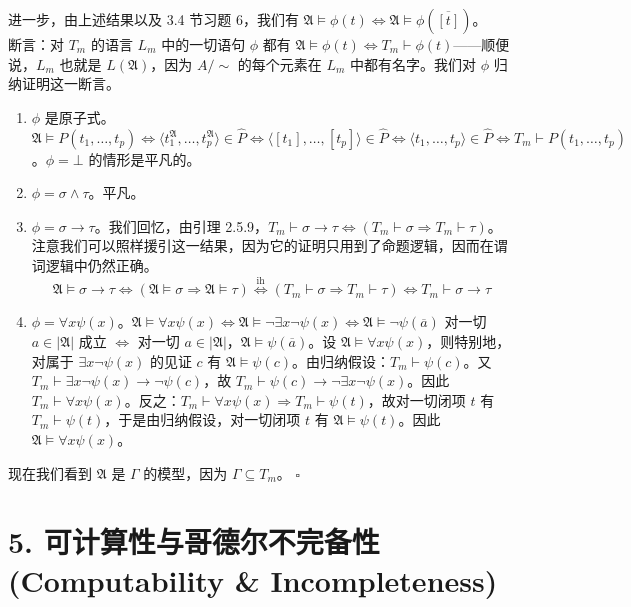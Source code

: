\documentclass[12pt, a4paper]{article}
\begin{document}
进一步，由上述结果以及 3.4 节习题 6，我们有 \(\mathfrak{A} \models \phi(t) \iff \mathfrak{A} \models \phi(\overline{[t]})\)。\\
断言：对 \(T_m\) 的语言 \(L_m\) 中的一切语句 \(\phi\) 都有 \(\mathfrak{A} \models \phi(t) \iff T_m \vdash \phi(t)\)——顺便说，\(L_m\) 也就是 \(L(\mathfrak{A})\)，因为 \(A/{\sim}\) 的每个元素在 \(L_m\) 中都有名字。我们对 \(\phi\) 归纳证明这一断言。
\begin{enumerate}
    \item[(i)] \(\phi\) 是原子式。\(\mathfrak{A} \models P(t_1, \dots, t_p) \iff \langle t_1^{\mathfrak{A}}, \dots, t_p^{\mathfrak{A}} \rangle \in \hat{P} \iff \langle [t_1], \dots, [t_p] \rangle \in \hat{P} \iff \langle t_1, \dots, t_p \rangle \in \hat{P} \iff T_m \vdash P(t_1, \dots, t_p)\)。\(\phi = \bot\) 的情形是平凡的。
    \item[(ii)] \(\phi = \sigma \wedge \tau\)。平凡。
    \item[(iii)] \(\phi = \sigma \to \tau\)。我们回忆，由引理 2.5.9，\(T_m \vdash \sigma \to \tau \iff (T_m \vdash \sigma \Rightarrow T_m \vdash \tau)\)。注意我们可以照样援引这一结果，因为它的证明只用到了命题逻辑，因而在谓词逻辑中仍然正确。
    \[
    \mathfrak{A} \models \sigma \to \tau \iff (\mathfrak{A} \models \sigma \Rightarrow \mathfrak{A} \models \tau) \stackrel{\text{ih}}{\iff} (T_m \vdash \sigma \Rightarrow T_m \vdash \tau) \iff T_m \vdash \sigma \to \tau
    \]
    \item[(iv)] \(\phi = \forall x \psi(x)\)。\(\mathfrak{A} \models \forall x \psi(x) \iff \mathfrak{A} \models \neg \exists x \neg \psi(x) \iff \mathfrak{A} \models \neg \psi(\overline{a})\) 对一切 \(a \in |\mathfrak{A}|\) 成立 \(\iff\) 对一切 \(a \in |\mathfrak{A}|\)，\(\mathfrak{A} \models \psi(\overline{a})\)。设 \(\mathfrak{A} \models \forall x \psi(x)\)，则特别地，对属于 \(\exists x \neg \psi(x)\) 的见证 \(c\) 有 \(\mathfrak{A} \models \psi(c)\)。由归纳假设：\(T_m \vdash \psi(c)\)。又 \(T_m \vdash \exists x \neg \psi(x) \to \neg \psi(c)\)，故 \(T_m \vdash \psi(c) \to \neg \exists x \neg \psi(x)\)。因此 \(T_m \vdash \forall x \psi(x)\)。反之：\(T_m \vdash \forall x \psi(x) \Rightarrow T_m \vdash \psi(t)\)，故对一切闭项 \(t\) 有 \(T_m \vdash \psi(t)\)，于是由归纳假设，对一切闭项 \(t\) 有 \(\mathfrak{A} \models \psi(t)\)。因此 \(\mathfrak{A} \models \forall x \psi(x)\)。
\end{enumerate}

现在我们看到 \(\mathfrak{A}\) 是 \(\Gamma\) 的模型，因为 \(\Gamma \subseteq T_m\)。 \hfill \(\square\)
\section*{5. 可计算性与哥德尔不完备性 (Computability \& Incompleteness)}
\end{document}
